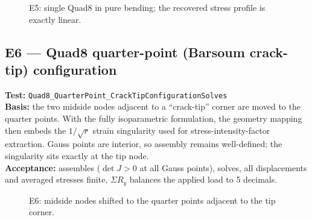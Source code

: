 \documentclass[11pt,a4paper]{article}
\newcommand{\wall}[3]{%
  \draw[thick] (#1,#2) -- (#1,#3);
  \fill[pattern=north east lines] (#1-0.18,#2) rectangle (#1,#3);
}
\begin{document}
\begin{figure}[H]\centering
{}
\caption{E5: single Quad8 in pure bending; the recovered stress profile is exactly linear.}
\end{figure}

\subsection{E6 --- Quad8 quarter-point (Barsoum crack-tip) configuration}
\textbf{Test:} \texttt{Quad8\_QuarterPoint\_CrackTipConfigurationSolves}\\
\textbf{Basis:} the two midside nodes adjacent to a ``crack-tip'' corner are
moved to the quarter points. With the fully isoparametric formulation, the
geometry mapping then embeds the $1/\sqrt{r}$ strain singularity used for
stress-intensity-factor extraction. Gauss points are interior, so assembly
remains well-defined; the singularity sits exactly at the tip node.\\
\textbf{Acceptance:} assembles ($\det J > 0$ at all Gauss points), solves, all
displacements and averaged stresses finite, $\Sigma R_y$ balances the applied
load to 5 decimals.

\begin{figure}[H]\centering
{}
\caption{E6: midside nodes shifted to the quarter points adjacent to the tip corner.}
\end{figure}
\end{document}
